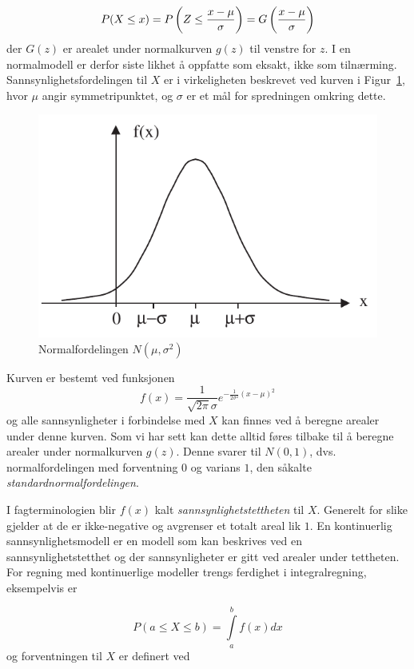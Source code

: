     \[P(X\le x)=P\left(Z\le {x-\mu\over \sigma}\right) =
     G\left({x-\mu\over \sigma}\right)\]
der $G(z)$ er arealet under normalkurven $g(z)$ til venstre for
$z$. I en normalmodell er derfor siste likhet å oppfatte som
eksakt, ikke som tilnærming. Sannsynlighetsfordelingen
til $X$ er i virkeligheten beskrevet ved kurven i Figur~\ref{fig:Normalfordelingen},
hvor  $\mu$ angir symmetripunktet, og $\sigma$ er et mål for
spredningen omkring dette.

\begin{figure}[ht]
\centering
	\includegraphics[scale=1.0]{figurer/fig8_5.pdf} 
 \caption{Normalfordelingen $N(\mu , \sigma ^2)$}
	\label{fig:Normalfordelingen}
\end{figure}
Kurven er bestemt ved funksjonen
\[   f(x)=\frac{1}{\sqrt{2\pi}\sigma} e^{-\frac{1}{2\sigma^2}(x-\mu )^2} \]
og alle sannsynligheter i forbindelse med $X$ kan finnes ved
å beregne arealer under denne kurven. Som vi har sett kan
dette alltid føres tilbake til å beregne arealer under
normalkurven $g(z)$. Denne svarer til $N(0,1)$, dvs.
normalfordelingen med forventning $0$ og varians $1$, den
såkalte {\em standardnormalfordelingen}.

I fagterminologien blir $f(x)$ kalt {\em sannsynlighetstettheten}
til $X$. Generelt for slike gjelder at de er ikke-negative og
avgrenser et totalt areal lik $1$. En kontinuerlig
sannsynlighetsmodell er en modell som kan beskrives ved en
sannsynlighetstetthet og der sannsynligheter er gitt ved arealer
under tettheten. For regning med kontinuerlige modeller trengs
ferdighet i inte\-gralregning, eksempelvis er 

\[  P(a\le X \le b)=\int\limits_a^b f(x)dx \]
og forventningen til $X$ er definert ved

